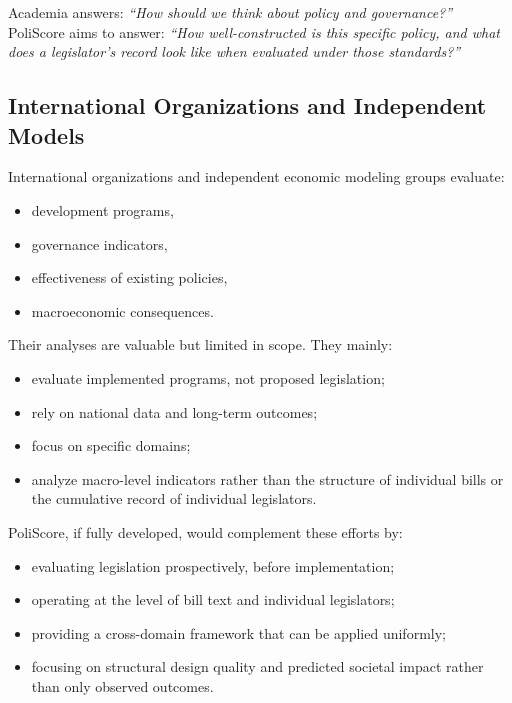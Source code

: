 \documentclass[12pt]{article}
\begin{document}
Academia answers: \textit{``How should we think about policy and governance?''}\\
PoliScore aims to answer: \textit{``How well-constructed is this specific policy, and what does a legislator's record look
like when evaluated under those standards?''}

\subsection{International Organizations and Independent Models}

International organizations and independent economic modeling groups evaluate:

\begin{itemize}
    \item development programs,
    \item governance indicators,
    \item effectiveness of existing policies,
    \item macroeconomic consequences.
\end{itemize}

Their analyses are valuable but limited in scope. They mainly:

\begin{itemize}
    \item evaluate implemented programs, not proposed legislation;
    \item rely on national data and long-term outcomes;
    \item focus on specific domains;
    \item analyze macro-level indicators rather than the structure of individual bills or the cumulative record of
    individual legislators.
\end{itemize}

PoliScore, if fully developed, would complement these efforts by:

\begin{itemize}
    \item evaluating legislation prospectively, before implementation;
    \item operating at the level of bill text and individual legislators;
    \item providing a cross-domain framework that can be applied uniformly;
    \item focusing on structural design quality and predicted societal impact rather than only observed outcomes.
\end{itemize}
\end{document}

